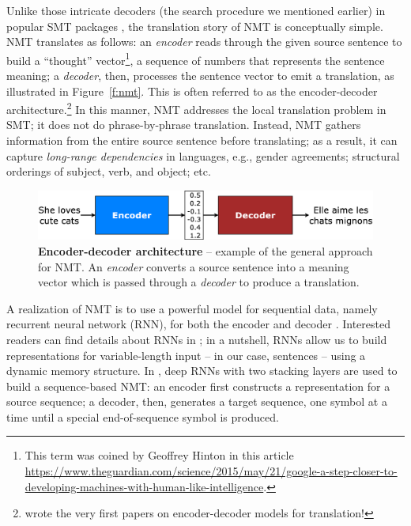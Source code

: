 Unlike those intricate decoders (the search procedure we mentioned earlier) in popular SMT packages
\cite{koehn2007moses,chiang07hiero,dyer10cdec,cer10phrasal}, the translation
story of NMT is conceptually simple.
NMT translates as follows: an {\it encoder} reads through the given source
sentence to build a ``thought''
vector\footnote{This term was coined by Geoffrey Hinton in this article
\url{https://www.theguardian.com/science/2015/may/21/google-a-step-closer-to-developing-machines-with-human-like-intelligence}.},
a sequence of numbers that represents the sentence meaning; a {\it
decoder}, then, processes the sentence vector to emit a translation, as
illustrated in Figure~\ref{f:nmt}. 
This is often referred to as the encoder-decoder
architecture.\footnote{ wrote the very first papers
on %
encoder-decoder models for translation!} In this manner, NMT addresses the
local translation problem in SMT; it does not do phrase-by-phrase translation.
Instead, NMT gathers information from the entire source sentence before translating; as a result,
it can capture {\it long-range dependencies} in languages, e.g., gender
agreements; structural orderings of subject, verb, and object; etc.
\begin{figure}[tbh!]
\centering
\includegraphics[width=\textwidth, clip=true, trim= 0 0 0 0]{img/encdec}
\caption[Encoder-decoder architecture]{{\bf Encoder-decoder architecture} --
example of the general approach for NMT. An {\it encoder} converts a source sentence
into a meaning vector which is passed through a {\it decoder} to produce a translation.
} 
\label{f:encdec}
\end{figure}

A realization of NMT is to use a powerful model for sequential data, namely recurrent
neural network (RNN), for both the encoder and decoder \cite{sutskever14,cho14}.
Interested readers can find details about RNNs in
; in a nutshell, RNNs allow us to build representations for
variable-length input -- in our case, sentences -- using a dynamic memory
structure. In , deep RNNs with two stacking layers are used to build
a sequence-based NMT: an encoder first constructs a representation for a source
sequence; a decoder, then, generates a target sequence,
one symbol at a time until a special end-of-sequence symbol is produced.

